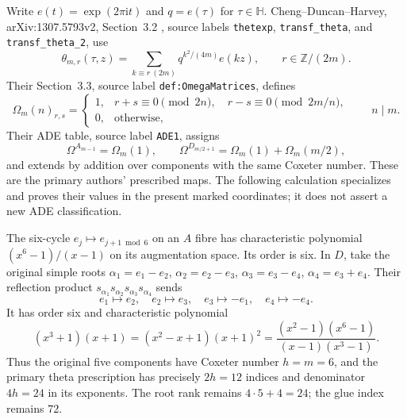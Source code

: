 Write $e(t)=\exp(2\pi\mathrm i t)$ and $q=e(\tau)$ for
$\tau\in\mathbb H$.  Cheng--Duncan--Harvey, arXiv:1307.5793v2,
Section~3.2 \cite[Sections~3.2--3.3]{esn:CDH2014}, source labels
\texttt{thetexp}, \texttt{transf\_theta},
and \texttt{transf\_theta\_2}, use
\[
 \theta_{m,r}(\tau,z)
 =\sum_{k\equiv r\ (2m)}q^{k^2/(4m)}e(kz),
 \qquad r\in\mathbb Z/(2m).
\]
Their Section~3.3, source label \texttt{def:OmegaMatrices}, defines
\[
 \Omega_m(n)_{r,s}
 =\begin{cases}
 1,&r+s\equiv0\pmod{2n},\quad r-s\equiv0\pmod{2m/n},\\
 0,&\text{otherwise},
 \end{cases}
 \qquad n\mid m.
\]
Their ADE table, source label \texttt{ADE1}, assigns
\[
 \Omega^{A_{m-1}}=\Omega_m(1),\qquad
 \Omega^{D_{m/2+1}}=\Omega_m(1)+\Omega_m(m/2),
\]
and extends by addition over components with the same Coxeter number.
These are the primary authors' prescribed maps.  The following calculation
specializes and proves their values in the present marked coordinates; it
does not assert a new ADE classification.

The six-cycle $e_j\mapsto e_{j+1\bmod6}$ on an $A$ fibre has
characteristic polynomial $(x^6-1)/(x-1)$ on its augmentation space.
Its order is six.  In $D$, take the original simple roots
$\alpha_1=e_1-e_2$, $\alpha_2=e_2-e_3$, $\alpha_3=e_3-e_4$,
$\alpha_4=e_3+e_4$.  Their reflection product
$s_{\alpha_1}s_{\alpha_2}s_{\alpha_3}s_{\alpha_4}$ sends
\[
 e_1\mapsto e_2,\quad e_2\mapsto e_3,\quad
 e_3\mapsto-e_1,\quad e_4\mapsto-e_4.
\]
It has order six and characteristic polynomial
\[
 (x^3+1)(x+1)
 =(x^2-x+1)(x+1)^2
 =\frac{(x^2-1)(x^6-1)}{(x-1)(x^3-1)}.
\]
Thus the original five components have Coxeter number $h=m=6$, and the
primary theta prescription has precisely $2h=12$ indices and denominator
$4h=24$ in its exponents.  The root rank remains $4\cdot5+4=24$;
the glue index remains $72$.

